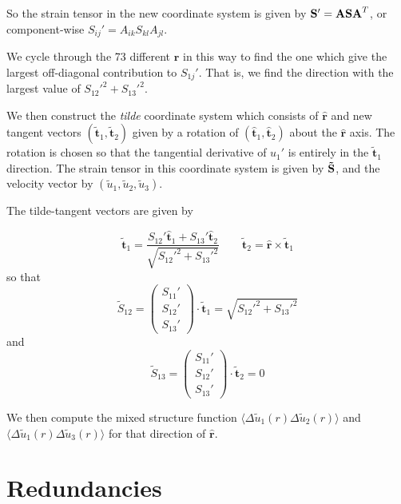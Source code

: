 \documentclass[12pt]{article}
\begin{document}
So the strain tensor in the new coordinate system is  given by 
${\bf S}' = {\bf A S A}^{T}$, or component-wise
$S_{ij}' = A_{ik} S_{kl} A_{jl}$.

We cycle through the 73 different $\bm{{\hat r}}$ in this way to find the one 
which give the largest off-diagonal
contribution to $S_{1j}'$.  That is, we find the 
direction with the largest value of $S_{12}'^2 + S_{13}'^2$.  

We then construct the {\em tilde} coordinate system which consists
of $\bm{{\hat r}}$ and new tangent vectors $( \bm{{\tilde t}}_1, 
\bm{{\tilde t}}_2 )$ given by a rotation of $( \bm{{\hat t}}_1, \bm{{\hat t}}_2 )$
about the $\bm{{\hat r}}$ axis.  The rotation is chosen so that the 
tangential derivative of $u_1'$ is entirely in the $\bm{{\tilde t}}_1$
direction.  The strain tensor in this coordinate system
is given by ${\bf \tilde S}$, and the velocity vector by 
$( \tilde u_1, \tilde u_2, \tilde u_3)$. 

The tilde-tangent vectors are given by 

\begin{equation}
\bm{{\tilde t}}_1 = \frac{S_{12}'  \bm{{\hat t}}_1 +  S_{13}'  \bm{{\hat t}}_2 }
                         {\sqrt{ S_{12}'^2 +  S_{13}'^2 } } 
\qquad
\bm{{\tilde t}}_2 = \bm{{\hat r}} \times \bm{{\tilde t}}_1
\end{equation}
so that
\begin{equation}
\tilde S_{12} = 
\begin{pmatrix}  S_{11}' \\
                 S_{12}' \\
                 S_{13}' 
\end{pmatrix}
\cdot \bm{{\tilde t}}_1 = 
 \sqrt{ S_{12}'^2 + S_{13}'^2 }
\end{equation}
and 
\begin{equation}
\tilde S_{13} = 
\begin{pmatrix}  S_{11}' \\
                 S_{12}' \\
                 S_{13}' 
\end{pmatrix}
\cdot \bm{{\tilde t}}_2 =  0
\end{equation}


We then compute the mixed structure function $\langle \Delta \tilde u_1 (r) 
\Delta \tilde u_2 (r)\rangle$ and 
$\langle \Delta \tilde u_1 (r) \Delta \tilde u_3 (r)\rangle$ for that direction of $\bm{{\hat r}}$.

\section*{Redundancies}
\end{document}
